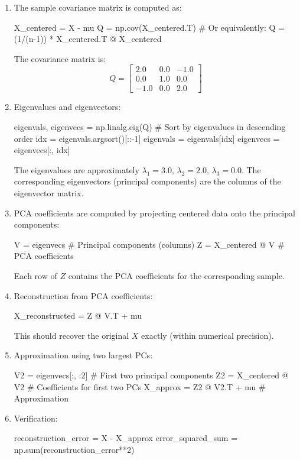 \documentclass[11pt]{article}
\begin{document}
\begin{enumerate}
\begin{solution}
\begin{enumerate}
\item The sample covariance matrix is computed as:
\begin{python}
X_centered = X - mu
Q = np.cov(X_centered.T)
# Or equivalently: Q = (1/(n-1)) * X_centered.T @ X_centered
\end{python}
The covariance matrix is:
\[
Q = \left[ \begin{array}{ccc}
    2.0 & 0.0 & -1.0 \\
    0.0 & 1.0 & 0.0 \\
    -1.0 & 0.0 & 2.0
\end{array} \right]
\]

\item Eigenvalues and eigenvectors:
\begin{python}
eigenvals, eigenvecs = np.linalg.eig(Q)
# Sort by eigenvalues in descending order
idx = eigenvals.argsort()[::-1]
eigenvals = eigenvals[idx]
eigenvecs = eigenvecs[:, idx]
\end{python}
The eigenvalues are approximately $\lambda_1 = 3.0$, $\lambda_2 = 2.0$, $\lambda_3 = 0.0$.
The corresponding eigenvectors (principal components) are the columns of the eigenvector matrix.

\item PCA coefficients are computed by projecting centered data onto the principal components:
\begin{python}
V = eigenvecs  # Principal components (columns)
Z = X_centered @ V  # PCA coefficients
\end{python}
Each row of $Z$ contains the PCA coefficients for the corresponding sample.

\item Reconstruction from PCA coefficients:
\begin{python}
X_reconstructed = Z @ V.T + mu
\end{python}
This should recover the original $X$ exactly (within numerical precision).

\item Approximation using two largest PCs:
\begin{python}
V2 = eigenvecs[:, :2]  # First two principal components
Z2 = X_centered @ V2  # Coefficients for first two PCs
X_approx = Z2 @ V2.T + mu  # Approximation
\end{python}

\item Verification:
\begin{python}
reconstruction_error = X - X_approx
error_squared_sum = np.sum(reconstruction_error**2)


\end{python}
\end{enumerate}
\end{solution}
\end{enumerate}
\end{document}
